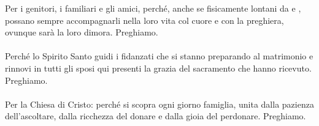 Per i genitori, i familiari e gli amici, perch\'e, anche se fisicamente lontani
da \bride{} e \groom, possano sempre accompagnarli nella loro vita col cuore e con la preghiera,
ovunque sar\`a la loro dimora. Preghiamo.\\

\Assembly{\answerforprayers}\\

Perch\'e lo Spirito Santo guidi i fidanzati che si stanno preparando al matrimonio
e rinnovi in tutti gli sposi qui presenti la grazia del sacramento che hanno
ricevuto. Preghiamo.\\

\Assembly{\answerforprayers}\\

Per la Chiesa di Cristo: perch\'e si scopra ogni giorno famiglia,
unita dalla pazienza dell'ascoltare,
dalla ricchezza del donare e dalla gioia del perdonare. Preghiamo.\\

\Assembly{\answerforprayers}\\


